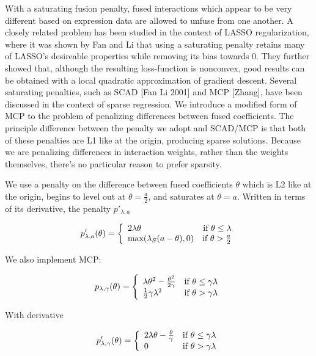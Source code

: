 \documentclass[11pt]{article}
\begin{document}
With a saturating fusion penalty, fused interactions which appear to be very different based on expression data are allowed to unfuse from one another. A closely related problem has been studied in the context of LASSO regularization, where it was shown by Fan and Li that using a saturating penalty retains many of LASSO's desireable properties while removing its bias towards 0. They further showed that, although the resulting loss-function is nonconvex, good results can be obtained with a local quadratic approximation of gradient descent. Several saturating penalties, such as SCAD [Fan Li 2001] and MCP [Zhang], have been discussed in the context of sparse regression. We introduce a modified form of MCP to the problem of penalizing differences between fused coefficients. The principle difference between the penalty we adopt and SCAD/MCP is that both of these penalties are L1 like at the origin, producing sparse solutions. Because we are penalizing differences in interaction weights, rather than the weights themselves, there's no particular reason to prefer sparsity. 

We use a penalty on the difference between fused coefficients $\theta$ which is L2 like at the origin, begins to level out at $\theta = \frac{a}{2}$, and saturates at $\theta = a$. Written in terms of its derivative, the penalty $p'_{\lambda, a}$

\begin{equation}
p'_{\lambda,a}(\theta) = \left\{
    \begin{array}{lr}
    2\lambda\theta & \text{if } \theta \leq \lambda\\
    \text{max}(\lambda_S(a-\theta),0) & \text{if } \theta > {a \over 2}
    \end{array}
    \right.
\end{equation}

We also implement MCP:

\begin{equation}
p_{\lambda,\gamma}(\theta) = \left\{
    \begin{array}{lr}
    \lambda\theta^2-{ \theta^2 \over 2\gamma} & \text{if } \theta \leq \gamma\lambda\\
    {1 \over 2}\gamma\lambda^2 & \text{if } \theta > \gamma\lambda
    \end{array}
    \right. 
\end{equation}

With derivative

\begin{equation}
p'_{\lambda,\gamma}(\theta) = \left\{
    \begin{array}{lr}
    2\lambda\theta - {\theta \over \gamma} & \text{if } \theta \leq \gamma\lambda\\
    0 & \text{if } \theta > \gamma\lambda
    \end{array}
    \right.
\end{equation}
    
\end{document}
